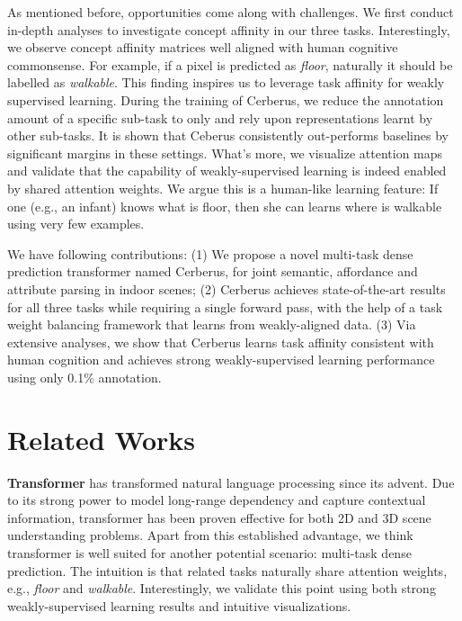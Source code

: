 \documentclass[10pt,twocolumn,letterpaper]{article}
\begin{document}
As mentioned before, opportunities come along with challenges. We first conduct in-depth analyses to investigate concept affinity in our three tasks. Interestingly, we observe concept affinity matrices well aligned with human cognitive commonsense. For example, if a pixel is predicted as \emph{floor}, naturally it should be labelled as \emph{walkable}. This finding inspires us to leverage task affinity for weakly supervised learning. During the training of Cerberus, we reduce the annotation amount of a specific sub-task to only  and rely upon representations learnt by other sub-tasks. It is shown that Ceberus consistently out-performs baselines by significant margins in these settings. What's more, we visualize attention maps and validate that the capability of weakly-supervised learning is indeed enabled by shared attention weights. We argue this is a human-like learning feature: If one (e.g., an infant) knows what is floor, then she can learns where is walkable using very few examples.
  
We have following contributions: (1) We propose a novel multi-task dense prediction transformer named Cerberus, for joint semantic, affordance and attribute parsing in indoor scenes; (2) Cerberus achieves state-of-the-art results for all three tasks while requiring a single forward pass, with the help of a task weight balancing framework that learns from weakly-aligned data. (3) Via extensive analyses, we show that Cerberus learns task affinity consistent with human cognition and achieves strong weakly-supervised learning performance using only 0.1\% annotation.






\section{Related Works}

\textbf{Transformer} \cite{vaswani2017attention} has transformed natural language processing since its advent. Due to its strong power to model long-range dependency and capture contextual information, transformer has been proven effective for both 2D \cite{liu2021swin}\cite{ranftl2021vision} and 3D \cite{liu2021group}\cite{chen2022pq} scene understanding problems. Apart from this established advantage, we think transformer is well suited for another potential scenario: multi-task dense prediction. The intuition is that related tasks naturally share attention weights, e.g., \emph{floor} and \emph{walkable}. Interestingly, we validate this point using both strong weakly-supervised learning results and intuitive visualizations.
\end{document}
